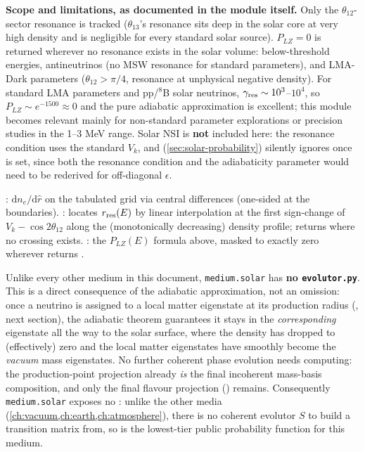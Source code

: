 \begin{notebox}
\textbf{Scope and limitations, as documented in the module itself.} Only
the $\theta_{12}$-sector resonance is tracked ($\theta_{13}$'s resonance
sits deep in the solar core at very high density and is negligible for
every standard solar source). $P_{LZ}=0$ is returned wherever no resonance
exists in the solar volume: below-threshold energies, antineutrinos (no MSW
resonance for standard parameters), and LMA-Dark parameters
($\theta_{12}>\pi/4$, resonance at unphysical negative density). For
standard LMA parameters and pp/$^8$B solar neutrinos,
$\gamma_{\rm res}\sim10^3$--$10^4$, so $P_{LZ}\sim e^{-1500}\approx0$ and
the pure adiabatic approximation is excellent; this module becomes
relevant mainly for non-standard parameter explorations or precision
studies in the 1--3 MeV range. Solar NSI is \textbf{not} included here: the
resonance condition uses the standard $V_k$, and 
(\cref{sec:solar-probability}) silently ignores  once
 is set, since both the resonance condition and the
adiabaticity parameter would need to be rederived for off-diagonal
$\epsilon$.
\end{notebox}

\begin{implbox}
: $\mathrm{d}n_e/\mathrm{d}\hat r$
on the tabulated grid via central differences (one-sided at the
boundaries). :
locates $r_{\rm res}(E)$ by linear interpolation at the first
sign-change of $V_k-\cos2\theta_{12}$ along the (monotonically decreasing)
density profile; returns  where no crossing exists.
: the $P_{LZ}(E)$ formula
above, masked to exactly zero wherever  returns
.
\end{implbox}

\begin{notebox}[title={No Coherent Medium Evolutor}]
\label{sec:solar-no-evolutor}
Unlike every other medium in this document, \texttt{medium.solar} has
\textbf{no \texttt{evolutor.py}}. This is a direct consequence of the
adiabatic approximation, not an omission: once a neutrino is assigned to a
local matter eigenstate at its production radius (, next
section), the adiabatic theorem guarantees it stays in the
\emph{corresponding} eigenstate all the way to the solar surface, where the
density has dropped to (effectively) zero and the local matter eigenstates
have smoothly become the \emph{vacuum} mass eigenstates. No further
coherent phase evolution needs computing: the production-point projection
already \emph{is} the final incoherent mass-basis composition, and only the
final flavour projection () remains.
Consequently \texttt{medium.solar} exposes no
: unlike the other media
(\cref{ch:vacuum,ch:earth,ch:atmosphere}), there is no coherent evolutor $S$
to build a transition matrix from, so  is
the lowest-tier public probability function for this medium.
\end{notebox}

